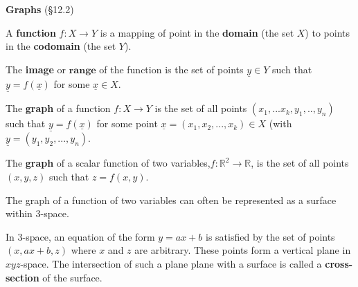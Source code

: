\documentclass[12pt,letterpaper,noanswers]{exam}
\begin{document}
\noindent\textbf{Graphs} (\S 12.2)
\begin{tcolorbox}


A \textbf{function} $f: X \rightarrow Y$ is a mapping of point in the \textbf{domain} (the set $X$) to points in the \textbf{codomain} (the set $Y$).

The \textbf{image} or $\textbf{range}$ of the function is the set of points $\underline{y} \in Y$ such that $\underline{y} = f(\underline{x})$ for some $\underline{x} \in X$.



The \textbf{graph} of a function $f: X\rightarrow Y$ is the set of all points $(x_1,...x_k,y_1,..,y_n)$ such that $\underline{y} = f(\underline{x})$ for some point $\underline{x} = (x_1,x_2,...,x_k)\in X$ (with $\underline{y} = (y_1,y_2,...,y_n)$.

The \textbf{graph} of a scalar function of two variables,$f:\mathbb{R}^2\rightarrow \mathbb{R}$, is the set of all points $(x,y,z)$ such that $z = f(x,y)$.

The graph of a function of two variables can often be represented as a surface within $3$-space.

\end{tcolorbox}

\begin{tcolorbox}
In $3$-space, an equation of the form $y = ax +b$ is satisfied by the set of points $(x,ax+b,z)$ where $x$ and $z$ are arbitrary.  These points form a vertical plane in $xyz$-space.  The intersection of such a plane plane with a surface is called a \textbf{cross-section} of the surface.
\end{tcolorbox}
\end{document}
